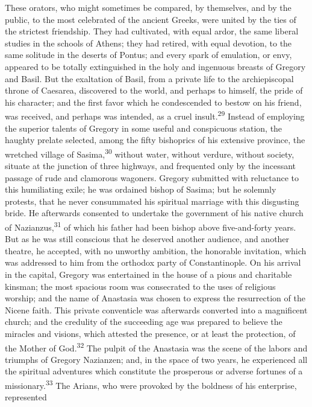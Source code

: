 These orators, who might sometimes be compared, by themselves,
and by the public, to the most celebrated of the ancient Greeks,
were united by the ties of the strictest friendship. They had
cultivated, with equal ardor, the same liberal studies in the
schools of Athens; they had retired, with equal devotion, to the
same solitude in the deserts of Pontus; and every spark of
emulation, or envy, appeared to be totally extinguished in the
holy and ingenuous breasts of Gregory and Basil. But the
exaltation of Basil, from a private life to the archiepiscopal
throne of Caesarea, discovered to the world, and perhaps to
himself, the pride of his character; and the first favor which he
condescended to bestow on his friend, was received, and perhaps
was intended, as a cruel insult.\textsuperscript{29} Instead of employing the
superior talents of Gregory in some useful and conspicuous
station, the haughty prelate selected, among the fifty bishoprics
of his extensive province, the wretched village of Sasima,\textsuperscript{30}
without water, without verdure, without society, situate at the
junction of three highways, and frequented only by the incessant
passage of rude and clamorous wagoners. Gregory submitted with
reluctance to this humiliating exile; he was ordained bishop of
Sasima; but he solemnly protests, that he never consummated his
spiritual marriage with this disgusting bride. He afterwards
consented to undertake the government of his native church of
Nazianzus,\textsuperscript{31} of which his father had been bishop above
five-and-forty years. But as he was still conscious that he
deserved another audience, and another theatre, he accepted, with
no unworthy ambition, the honorable invitation, which was
addressed to him from the orthodox party of Constantinople. On
his arrival in the capital, Gregory was entertained in the house
of a pious and charitable kinsman; the most spacious room was
consecrated to the uses of religious worship; and the name of
Anastasia was chosen to express the resurrection of the Nicene
faith. This private conventicle was afterwards converted into a
magnificent church; and the credulity of the succeeding age was
prepared to believe the miracles and visions, which attested the
presence, or at least the protection, of the Mother of God.\textsuperscript{32}
The pulpit of the Anastasia was the scene of the labors and
triumphs of Gregory Nazianzen; and, in the space of two years, he
experienced all the spiritual adventures which constitute the
prosperous or adverse fortunes of a missionary.\textsuperscript{33} The Arians,
who were provoked by the boldness of his enterprise, represented
